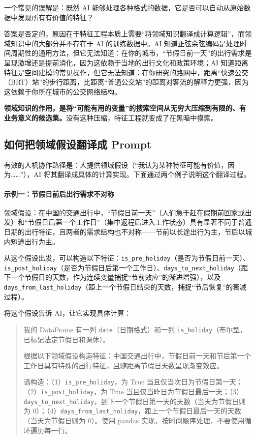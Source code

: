 一个常见的误解是：既然 AI 能够处理各种格式的数据，它是否可以自动从原始数据中发现所有有价值的特征？

答案是否定的，原因在于特征工程本质上需要“将领域知识翻译成计算逻辑”，而领域知识中的大部分并不存在于 AI 的训练数据中。AI 知道正弦余弦编码是处理时间周期性的通用方法，但它无法知道：在你的城市，“节假日前一天”的出行需求是呈现激增还是提前消化，因为这依赖于当地的出行文化和政策环境；AI 知道距离特征是空间建模的常见操作，但它无法知道：在你研究的路网中，距离“快速公交（BRT）站”的步行距离，比距离“普通公交站”的距离对客流的解释力更强，因为这依赖于你所在城市的公交网络结构。

\textbf{领域知识的作用，是将“可能有用的变量”的搜索空间从无穷大压缩到有限的、有业务意义的候选集。}没有这种压缩，特征工程就变成了在黑暗中摸索。

\subsection{如何把领域假设翻译成 Prompt}

有效的人机协作路径是：人提供领域假设（“我认为某种特征可能有价值，因为……”），AI 将其翻译成具体的计算实现。下面通过两个例子说明这个翻译过程。

\paragraph{示例一：节假日前后出行需求不对称}

领域假设：在中国的交通出行中，“节假日前一天”（人们急于赶在假期前回家或出发）和“节假日后第一个工作日”（集中返程后进入工作状态）具有显著不同于普通日期的出行特征，且两者的需求结构也不对称——节前以长途出行为主，节后以城内短途出行为主。

从这个假设出发，可以构造以下特征：\texttt{is\_pre\_holiday}（是否为节假日前一天）、\texttt{is\_post\_holiday}（是否为节假日后第一个工作日）、\texttt{days\_to\_next\_holiday}（距下一个节假日的天数，作为连续变量捕捉“节前效应”的渐进增强），以及 \texttt{days\_from\_last\_holiday}（距上一个节假日结束的天数，捕捉“节后恢复”的衰减过程）。

将这个假设告诉 AI，让它实现具体计算：

\begin{quote}
我的 DataFrame 有一列 \texttt{date}（日期格式）和一列 \texttt{is\_holiday}（布尔型，已标记法定节假日和调休）。

根据以下领域假设构造特征：中国交通出行中，节假日前一天和节后第一个工作日具有特殊的出行特征，且随距离节假日天数呈现渐变效应。

请构造：（1）\texttt{is\_pre\_holiday}，为 True 当且仅当次日为节假日第一天；（2）\texttt{is\_post\_holiday}，为 True 当且仅当昨日为节假日最后一天；（3）\texttt{days\_to\_next\_holiday}，到下一个节假日第一天的天数（当天为节假日则为 0）；（4）\texttt{days\_from\_last\_holiday}，距上一个节假日最后一天的天数（当天为节假日则为 0）。使用 pandas 实现，按时间顺序处理，不要使用循环遍历每一行。
\end{quote}

